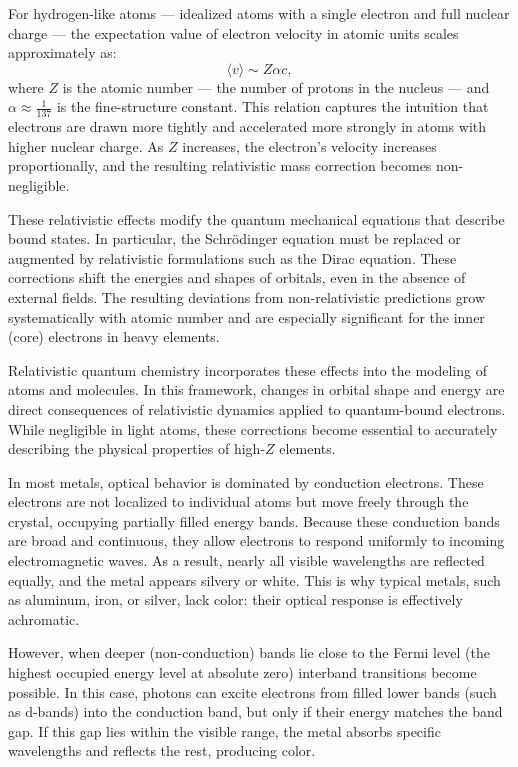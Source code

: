 For hydrogen-like atoms — idealized atoms with a single electron and full nuclear charge — the expectation value of electron velocity in atomic units scales approximately as:
\[
\langle v \rangle \sim Z\alpha c,
\]
where \( Z \) is the atomic number — the number of protons in the nucleus — and \( \alpha \approx \tfrac{1}{137} \) is the fine-structure constant. This relation captures the intuition that electrons are drawn more tightly and accelerated more strongly in atoms with higher nuclear charge. As \( Z \) increases, the electron’s velocity increases proportionally, and the resulting relativistic mass correction becomes non-negligible.

These relativistic effects modify the quantum mechanical equations that describe bound states. In particular, the Schrödinger equation must be replaced or augmented by relativistic formulations such as the Dirac equation. These corrections shift the energies and shapes of orbitals, even in the absence of external fields. The resulting deviations from non-relativistic predictions grow systematically with atomic number and are especially significant for the inner (core) electrons in heavy elements.

Relativistic quantum chemistry incorporates these effects into the modeling of atoms and molecules. In this framework, changes in orbital shape and energy are direct consequences of relativistic dynamics applied to quantum-bound electrons. While negligible in light atoms, these corrections become essential to accurately describing the physical properties of high-$Z$ elements.

In most metals, optical behavior is dominated by conduction electrons. These electrons are not localized to individual atoms but move freely through the crystal, occupying partially filled energy bands. Because these conduction bands are broad and continuous, they allow electrons to respond uniformly to incoming electromagnetic waves. As a result, nearly all visible wavelengths are reflected equally, and the metal appears silvery or white. This is why typical metals, such as aluminum, iron, or silver, lack color: their optical response is effectively achromatic.

However, when deeper (non-conduction) bands lie close to the Fermi level (the highest occupied energy level at absolute zero) interband transitions become possible. In this case, photons can excite electrons from filled lower bands (such as d-bands) into the conduction band, but only if their energy matches the band gap. If this gap lies within the visible range, the metal absorbs specific wavelengths and reflects the rest, producing color.

